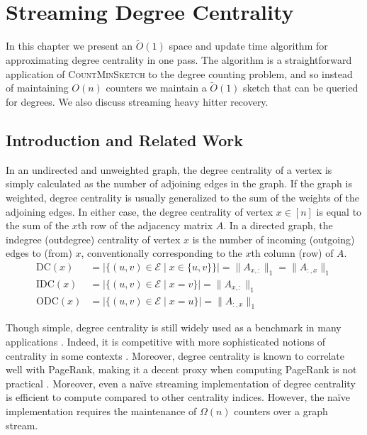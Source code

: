 \documentclass{report}
\newcommand{\algoname}[1]{\textnormal{\textsc{#1}}}
\begin{document}
\chapter{Streaming Degree Centrality} \label{chap:dc}

In this chapter we present an $\widetilde{O}(1)$ space and update time algorithm for approximating degree centrality in one pass.
The algorithm is a straightforward application of \algoname{CountMinSketch} to the degree counting problem, and so instead of maintaining $O(n)$ counters we maintain a $\widetilde{O}(1)$ sketch that can be queried for degrees.
We also discuss streaming heavy hitter recovery.

\section{Introduction and Related Work} \label{dc:sec:intro}

In an undirected and unweighted graph, the degree centrality of a vertex is simply calculated as the number of adjoining edges in the graph.
If the graph is weighted, degree centrality is usually generalized to the sum of the weights of the adjoining edges. 
In either case, the degree centrality of  vertex $x \in [n]$ is equal to the sum of the $x$th row of the adjacency matrix $A$.
In a directed graph, the indegree (outdegree) centrality of vertex $x$ is the number of incoming (outgoing) edges to (from) $x$, conventionally corresponding to the $x$th column (row) of $A$.
%
\begin{align} 
\label{eq:dc}
\textrm{DC}(x) 
&= |\{(u,v) \in \mathcal{E} \mid x \in \{u,v\} \}| 
= \| A_{x,:} \|_1 
= \| A_{:,x} \|_1 \\
\label{eq:idc}
\textrm{IDC}(x) 
&= |\{(u,v) \in \mathcal{E} \mid x =v \}| 
= \| A_{x,:} \|_1 \\
\label{eq:odc}
\textrm{ODC}(x) 
&= |\{(u,v) \in \mathcal{E} \mid x =u \}|
= \| A_{:,x} \|_1
\end{align}
%


Though simple, degree centrality is still widely used as a benchmark in many applications \cite{boldi2014axioms}. 
Indeed, it is competitive with more sophisticated notions of centrality in some contexts \cite{upstill2003predicting}.
Moreover, degree centrality is known to correlate well with PageRank, making it a decent proxy when computing PageRank is not practical \cite{upstill2003predicting}.
Moreover, even a na\"ive streaming implementation of degree centrality is efficient to compute compared to other centrality indices.
However, the na\"ive implementation requires the maintenance of $\Omega(n)$ counters over a graph stream. 
\end{document}

